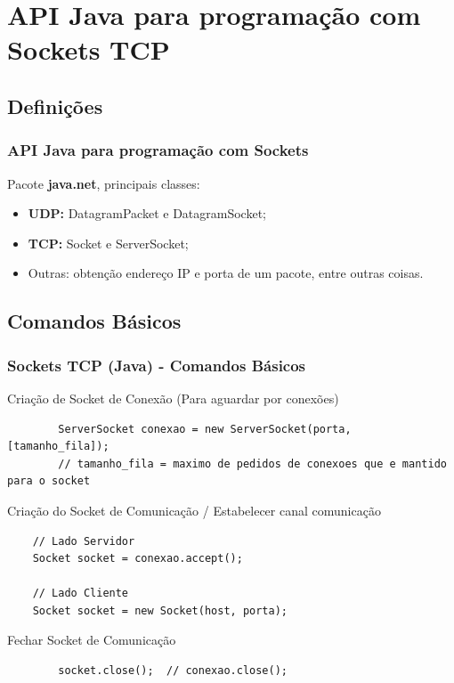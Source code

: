 \documentclass[hyperref={pdfpagelabels=false},table]{beamer}
\begin{document}
\section{API Java para programação com Sockets TCP}
\subsection{Definições}

\begin{frame}[t]\frametitle{API Java para programação com Sockets}
  \begin{block}{Pacote \textbf{java.net}, principais classes:}
    \begin{itemize}
      \item \textbf{UDP:} DatagramPacket e DatagramSocket;
      \item \textbf{TCP:} Socket e ServerSocket;
      \item Outras: obtenção endereço IP e porta de um pacote, entre outras coisas.
     \end{itemize}
  \end{block}
\end{frame}



\subsection{Comandos Básicos}
\begin{frame}[fragile]
	\frametitle{Sockets TCP (Java) - Comandos Básicos}

	Criação de Socket de Conexão (Para aguardar por conexões)
	\begin{lstlisting}
    	ServerSocket conexao = new ServerSocket(porta, [tamanho_fila]);
		// tamanho_fila = maximo de pedidos de conexoes que e mantido para o socket
	\end{lstlisting} 
	
	
	Criação do Socket de Comunicação / Estabelecer canal comunicação
	\begin{lstlisting}
	// Lado Servidor
  	Socket socket = conexao.accept();

	// Lado Cliente
	Socket socket = new Socket(host, porta);

	\end{lstlisting} 

	Fechar Socket de Comunicação
	\begin{lstlisting}
		socket.close();  // conexao.close();
	\end{lstlisting} 

\end{frame}
\end{document}
